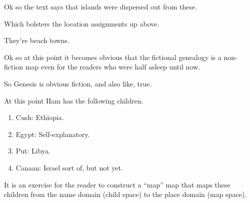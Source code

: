 {
}
{
}
{
	Ok so the text says that islands were dispersed out from these.
	
	Which bolsters the location assignments up above.
	
	They're beach towns.%
}

{
}
{
}
{
	Ok so at this point it becomes obvious that the fictional genealogy
	is a non-fiction map even for the readers who were half asleep until now.

	So Genesis is obvious fiction, and also like, true.

	At this point Ham has the following children.
	
	\begin{enumerate}
	\item Cush: Ethiopia.
	\item Egypt: Self-explanatory.
	\item Put: Libya.
	\item Canaan: Israel sort of, but not yet.
	\end{enumerate}
}

{
}
{
}
{
	It is an exercise for the reader to construct a ``map'' map that maps
	these children from the name domain (child space) to the place domain
	(map space).

}

